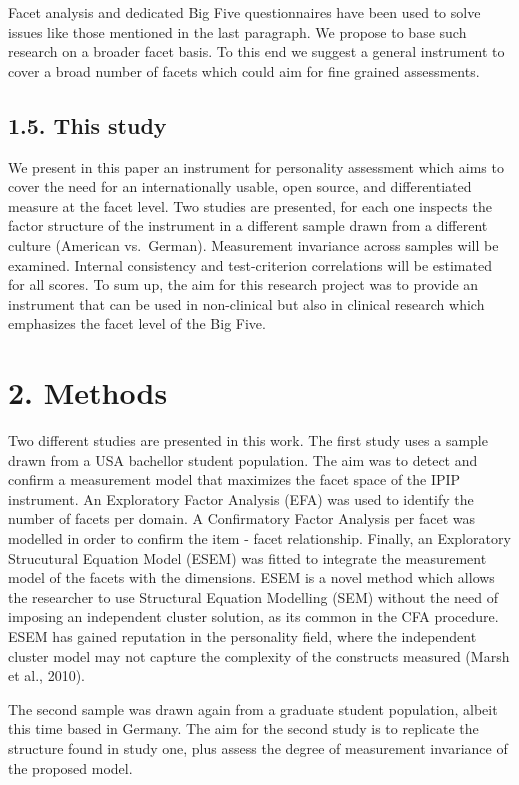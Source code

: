 \documentclass[man]{apa6}
\theoremstyle{definition}
\theoremstyle{definition}
\theoremstyle{definition}
\theoremstyle{remark}
\begin{document}
Facet analysis and dedicated Big Five questionnaires have been used to
solve issues like those mentioned in the last paragraph. We propose to
base such research on a broader facet basis. To this end we suggest a
general instrument to cover a broad number of facets which could aim for
fine grained assessments.

\hypertarget{this-study}{%
\subsection{1.5. This study}\label{this-study}}

We present in this paper an instrument for personality assessment which
aims to cover the need for an internationally usable, open source, and
differentiated measure at the facet level. Two studies are presented,
for each one inspects the factor structure of the instrument in a
different sample drawn from a different culture (American vs.~German).
Measurement invariance across samples will be examined. Internal
consistency and test-criterion correlations will be estimated for all
scores. To sum up, the aim for this research project was to provide an
instrument that can be used in non-clinical but also in clinical
research which emphasizes the facet level of the Big Five.

\hypertarget{methods}{%
\section{2. Methods}\label{methods}}

Two different studies are presented in this work. The first study uses a
sample drawn from a USA bachellor student population. The aim was to
detect and confirm a measurement model that maximizes the facet space of
the IPIP instrument. An Exploratory Factor Analysis (EFA) was used to
identify the number of facets per domain. A Confirmatory Factor Analysis
per facet was modelled in order to confirm the item - facet
relationship. Finally, an Exploratory Strucutural Equation Model (ESEM)
was fitted to integrate the measurement model of the facets with the
dimensions. ESEM is a novel method which allows the researcher to use
Structural Equation Modelling (SEM) without the need of imposing an
independent cluster solution, as its common in the CFA procedure. ESEM
has gained reputation in the personality field, where the independent
cluster model may not capture the complexity of the constructs measured
(Marsh et al., 2010).

The second sample was drawn again from a graduate student population,
albeit this time based in Germany. The aim for the second study is to
replicate the structure found in study one, plus assess the degree of
measurement invariance of the proposed model.
\end{document}
